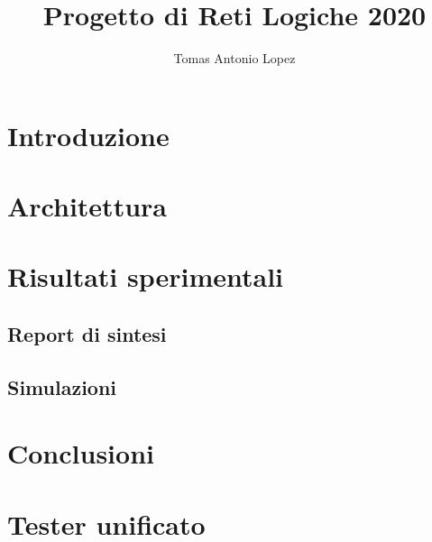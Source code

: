 \documentclass[11pt,a4paper]{article}
\title{\textbf{Progetto di Reti Logiche 2020}}
\author{Tomas Antonio Lopez}
\begin{document}
\maketitle
\tableofcontents
\listoffigures

\newpage

\section{Introduzione}

\section{Architettura}

\section{Risultati sperimentali}
\subsection{Report di sintesi}
\subsection{Simulazioni}

\section{Conclusioni}

\newpage

\appendix
\section{Tester unificato}
\end{document}
